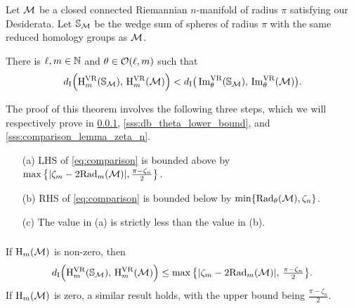 Let \(\mathcal{M}\) be a closed connected Riemannian \(n\)-manifold of radius \(\pi\) satisfying our Desiderata.
Let $\mathbb{S}_{\mathcal{M}}$ be the wedge sum of spheres of radius \(\pi\) with the same reduced homology groups as $\mathcal{M}$.

\medskip\theorem
There is $\ell, m \in \mathbb{N}$ and $\theta \in \mathcal{O}(\ell, m)$ such that
\begin{equation}\label{eq:comparison}
    d_{\mathrm{I}} \Big(\mathrm{H}^{\mathrm{VR}}_{m}(\mathbb{S}_{\mathcal{M}}),\, \mathrm{H}^{\mathrm{VR}}_{m}(\mathcal{M})\Big) < d_{\mathrm{I}} \big(\operatorname{Im}^{\mathrm{VR}}_{\theta}(\mathbb{S}_{\mathcal{M}}),\, \operatorname{Im}^{\mathrm{VR}}_{\theta}(\mathcal{M})\big).
\end{equation}

The proof of this theorem involves the following three steps, which we will respectively prove in \cref{sss:db_upper_bound}, \cref{sss:db_theta_lower_bound}, and \cref{sss:comparison_lemma_zeta_n}.
\begin{enumerate}
    \item [(a)] LHS of \cref{eq:comparison} is bounded above by $\max\big\{|\zeta_m  - 2\mathrm{Rad}_{m}(\mathcal{M}) |, \tfrac{\pi - \zeta_n}{2}\big\}$.
    \item [(b)] RHS of \cref{eq:comparison} is bounded below by $\min\{\mathrm{Rad}_{\theta}(\mathcal{M}), \zeta_n\}$.
    \item [(c)] The value in (a) is strictly less than the value in (b).
\end{enumerate}

\subsubsection{}\label{sss:db_upper_bound}

\medskip\lemma
If \( \operatorname{H}_m(\mathcal{M}) \) is non-zero, then
\begin{equation}\label{eq:db_usual_upper_bound}
    d_{\mathrm{I}}\Big(\mathrm{H}^{\mathrm{VR}}_{m}(\mathbb{S}_{\mathcal{M}}),\, \mathrm{H}^{\mathrm{VR}}_{m}(\mathcal{M})\Big)
	\leq \max\big\{|\zeta_m  - 2\mathrm{Rad}_{m}(\mathcal{M}) |,\, \tfrac{\pi - \zeta_n}{2}\big\}.
\end{equation}
If \( \operatorname{H}_m(\mathcal{M}) \) is zero, a similar result holds, with the upper bound being $\tfrac{\pi - \zeta_n}{2}$.

